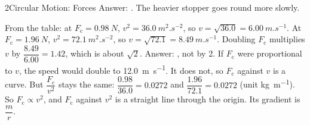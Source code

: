 \begin{chapteranswers}{2}{Circular Motion: Forces}
        Answer: . The heavier stopper goes round more slowly.
  \item From the table: at $F_\mathrm{c} = \qty{0.98}{N}$, $v^2 = \qty{36.0}{m^2.s^{-2}}$, so
        $v = \sqrt{36.0} = \qty{6.00}{m.s^{-1}}$. At $F_\mathrm{c} = \qty{1.96}{N}$,
        $v^2 = \qty{72.1}{m^2.s^{-2}}$, so $v = \sqrt{72.1} = \qty{8.49}{m.s^{-1}}$.
        Doubling $F_\mathrm{c}$ multiplies $v$ by $\dfrac{8.49}{6.00} = 1.42$, which is about
        $\sqrt{2}$. Answer: , not by 2.
        If $F_\mathrm{c}$ were proportional to $v$, the speed would double to
        \qty{12.0}{m.s^{-1}}. It does not, so $F_\mathrm{c}$ against $v$ is a curve.
        But $\dfrac{F_\mathrm{c}}{v^2}$ stays the same: $\dfrac{0.98}{36.0} = 0.0272$ and
        $\dfrac{1.96}{72.1} = 0.0272$ (unit \si{kg.m^{-1}}). So $F_\mathrm{c} \propto v^2$, and
        $F_\mathrm{c}$ against $v^2$ is a straight line through the origin. Its gradient is
        $\dfrac{m}{r}$.
\end{chapteranswers}
